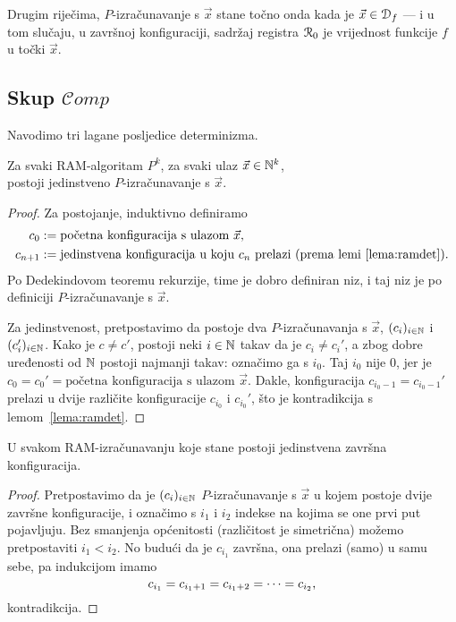 Drugim riječima, $P$-izračunavanje s $\vec x$ stane točno onda kada je $\vec x\in\mathcal D_{f}$ --- i u tom slučaju, u završnoj konfiguraciji, sadržaj registra $\mathcal R_{0}$ je vrijednost funkcije $f$ u točki $\vec x$.

\subsection{Skup \texorpdfstring{$\mathscr Comp$}{Comp}}

Navodimo tri lagane posljedice determinizma.

\begin{propozicija}[{name=[jedinstvenost izračunavanja]}]\label{prop:ramdet}
Za svaki RAM-algoritam $P^k$, za svaki ulaz $\vec x\in{\mathbb N}^k$,\\ postoji jedinstveno $P$-izračunavanje s $\vec x$.
\end{propozicija}
\begin{proof}
Za postojanje, induktivno definiramo
\begin{align}
    c_0&:=\text{početna konfiguracija s ulazom $\vec x$,}\\
    c_{n+1}&:=\text{jedinstvena konfiguracija u koju $c_n$ prelazi (prema lemi~\ref{lema:ramdet}).}
\end{align}
Po Dedekindovom teoremu rekurzije, time je dobro definiran niz, i taj niz je po definiciji $P$-iz\-ra\-ču\-na\-va\-nje s $\vec x$.

Za jedinstvenost, pretpostavimo da postoje dva $P$-izračunavanja s $\vec x$, $(c_i)_{i\in{\mathbb N}}$ i $(c_i')_{i\in{\mathbb N}}$.
Kako je $c\ne c'$, postoji neki $i\in{\mathbb N}$ takav da je $c_i\ne c_i'$, a zbog dobre uređenosti od ${\mathbb N}$ postoji najmanji takav: označimo ga s $i_0$.
Taj $i_0$ nije $0$, jer je $c_0=c_0'=\text{početna konfiguracija s ulazom $\vec x$}$. Dakle, konfiguracija $c_{i_0-1}=c_{i_0-1}'$ prelazi u dvije različite konfiguracije $c_{i_0}$ i $c_{i_0}'$, što je kontradikcija s lemom~\ref{lema:ramdet}.
\end{proof}

\begin{propozicija}[{name=[jedinstvenost završne konfiguracije]}]\label{prop:ram1zav}
U svakom RAM-izračunavanju koje stane postoji jedinstvena završna konfiguracija.
\end{propozicija}
\begin{proof}
Pretpostavimo da je $(c_i)_{i\in{\mathbb N}}$ $P$-izračunavanje s $\vec x$ u kojem postoje dvije završne konfiguracije, i označimo s $i_1$ i $i_2$ indekse na kojima se one prvi put pojavljuju. Bez smanjenja općenitosti (različitost je simetrična) možemo pretpostaviti $i_1<i_2$. No budući da je $c_{i_1}$ završna, ona prelazi (samo) u samu sebe, pa indukcijom imamo
\begin{equation}
    c_{i_1}=c_{i_1+1}=c_{i_1+2}=\dotsb=c_{i_2}\text,
\end{equation}
kontradikcija.
\end{proof}

